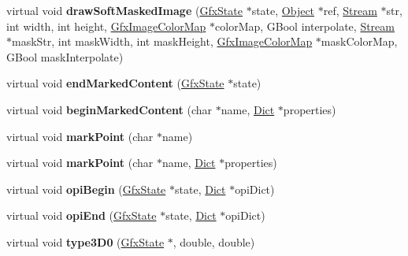 \begin{DoxyCompactItemize}
\item 
\mbox{\label{class_output_dev_ac2ee00e7cddb1617eeeb4a32f089be99}} 
virtual void {\bfseries draw\+Soft\+Masked\+Image} (\hyperlink{class_gfx_state}{Gfx\+State} $\ast$state, \hyperlink{class_object}{Object} $\ast$ref, \hyperlink{class_stream}{Stream} $\ast$str, int width, int height, \hyperlink{class_gfx_image_color_map}{Gfx\+Image\+Color\+Map} $\ast$color\+Map, G\+Bool interpolate, \hyperlink{class_stream}{Stream} $\ast$mask\+Str, int mask\+Width, int mask\+Height, \hyperlink{class_gfx_image_color_map}{Gfx\+Image\+Color\+Map} $\ast$mask\+Color\+Map, G\+Bool mask\+Interpolate)
\item 
\mbox{\label{class_output_dev_ae94023fd2c678bf75b13e58ba60f1196}} 
virtual void {\bfseries end\+Marked\+Content} (\hyperlink{class_gfx_state}{Gfx\+State} $\ast$state)
\item 
\mbox{\label{class_output_dev_abb35b1288a0f1d823a24f3e45c6067b9}} 
virtual void {\bfseries begin\+Marked\+Content} (char $\ast$name, \hyperlink{class_dict}{Dict} $\ast$properties)
\item 
\mbox{\label{class_output_dev_acd0ecfc113ad397b105cfcd3e443aab4}} 
virtual void {\bfseries mark\+Point} (char $\ast$name)
\item 
\mbox{\label{class_output_dev_a473f1fde6b4cfd2cf29a2f737620f1ea}} 
virtual void {\bfseries mark\+Point} (char $\ast$name, \hyperlink{class_dict}{Dict} $\ast$properties)
\item 
\mbox{\label{class_output_dev_a4cd6b911a4dc9a4aacc4b60d88afe01c}} 
virtual void {\bfseries opi\+Begin} (\hyperlink{class_gfx_state}{Gfx\+State} $\ast$state, \hyperlink{class_dict}{Dict} $\ast$opi\+Dict)
\item 
\mbox{\label{class_output_dev_a49f554f17b8c532fa813c180afafaf82}} 
virtual void {\bfseries opi\+End} (\hyperlink{class_gfx_state}{Gfx\+State} $\ast$state, \hyperlink{class_dict}{Dict} $\ast$opi\+Dict)
\item 
\mbox{\label{class_output_dev_a04cf5c31e2b2bb4ae0b2376350234ec0}} 
virtual void {\bfseries type3\+D0} (\hyperlink{class_gfx_state}{Gfx\+State} $\ast$, double, double)

\end{DoxyCompactItemize}
